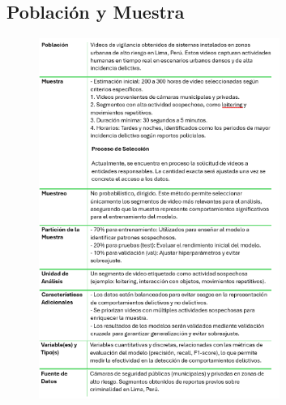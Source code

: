 \subsection{Población y Muestra}
\begin{figure}[h] %
    \centering
    \includegraphics[width=0.7\textwidth]{3/figures/tabla muestra poblacion.png} %
    \label{fig:ejemplo} %
\end{figure}